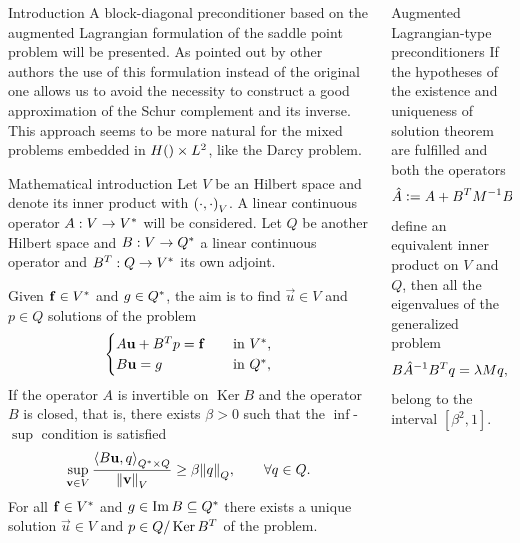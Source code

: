 \documentclass[final]{beamer}
\newlength{\onecolwid}
\DeclareMathOperator*{\Kernel}{Ker}
\DeclareMathOperator*{\Range}{Im}
\let\div\relax
\DeclareMathOperator{\div}{div}
\begin{document}
\begin{frame}[t]
\begin{columns}[t]
\begin{column}{\onecolwid}
\begin{block}{Introduction}
A block-diagonal preconditioner based on the augmented Lagrangian formulation
of the saddle point problem will be presented. As pointed out by other authors
the use of this formulation instead of the original one allows us to avoid the
necessity to construct a good approximation of the Schur complement and its
inverse. This approach seems to be more natural for the mixed problems embedded
in $H(\div)\times L^2$, like the Darcy problem.
\end{block}

\begin{block}{Mathematical introduction}
Let $V$ be an Hilbert space and denote its inner product with
$\inner{\cdot}{\cdot}[V]$. A linear continuous operator $A:V \to V^*$ will
be considered. Let $Q$ be another Hilbert space and $B:V \to Q^*$ a linear
continuous operator and $B^T:Q \to V^*$ its own adjoint.

Given $\vec{f} \in \dual{V}$ and $g \in Q^*$, the aim is to find
$\vec{u} \in V$ and $p \in Q$ solutions of the problem
\[
  \begin{cases}
    A\vec{u} + \adj{B}p = \vec{f} \quad &\text{in }\dual{V}, \\
    B\vec{u} = g                  \quad &\text{in }\dual{Q},
  \end{cases}
\]
If the operator $A$ is invertible on $\Kernel{B}$ and the operator $B$ is
closed, that is, there exists $\beta > 0$ such that the $\inf$-$\sup$ condition
is satisfied
\[
    \sup_{\vec{v} \in V}
    \frac{\duality{B\vec{u}}{q}[Q]}{\norm{\vec{v}}[V]} \ge
    \beta \norm{q}[Q],
    \qquad
    \forall q \in Q.
\]
For all $\vec{f} \in \dual{V}$ and $g \in \Range{B} \subseteq \dual{Q}$ there
exists a unique solution $\vec{u}\in V$ and $p\in Q/\Kernel{\adj{B}}$ of the
problem.
\end{block}

\end{column} %


\begin{column}{\onecolwid} %

\begin{block}{Augmented Lagrangian-type preconditioners}
If the hypotheses of the existence and uniqueness of solution theorem are
fulfilled and both the operators
\[
    \hat{A}\mathrel{\mathop:}= A + B^TM^{-1}B: V \to V^*
    \qquad\text{and}\qquad
    M:Q \to Q^*,
\]
define an equivalent inner product on $V$ and $Q$, then all the eigenvalues of
the generalized problem
\[
    B\hat{A}^{-1}B^Tq = \lambda Mq, \qquad\text{in }Q^*,
\]
belong to the interval $[\beta^2,1]$.


\end{block}
\end{column}
\end{columns}
\end{frame}
\end{document}

